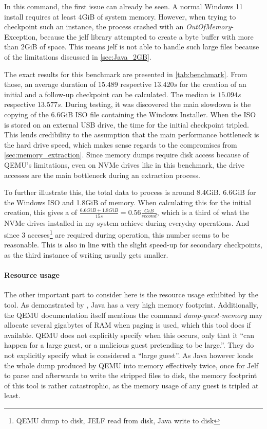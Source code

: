 In this command, the first issue can already be seen.
A normal Windows 11 install requires at least 4GiB of system memory.
However, when trying to checkpoint such an instance, the process crashed with an \emph{OutOfMemory}-Exception,
because the jelf library\cite{jelf} attempted to create a byte buffer with more than 2GiB of space.
This means jelf is not able to handle such large files because of the limitations discussed in \autoref{sec:Java_2GB}.

The exact results for this benchmark are presented in \autoref{tab:benchmark}.
From those, an average duration of $15.489$ respective $13.420s$ for the creation of an initial and a follow-up checkpoint can be calculated.
The median is $15.094s$ respective $13.577s$.
During testing, it was discovered the main slowdown is the copying of the 6.6GiB ISO file containing the Windows Installer.
When the ISO is stored on an external USB drive, the time for the initial checkpoint tripled.
This lends credibility to the assumption that the main performance bottleneck is the hard drive speed,
which makes sense regards to the compromises from \autoref{sec:memory_extraction}.
Since memory dumps require disk access because of QEMU's limitations,
even on NVMe drives like in this benchmark, the drive accesses are the main bottleneck during an extraction process.

To further illustrate this, the total data to process is around 8.4GiB. 6.6GiB for the Windows ISO and 1.8GiB of memory.
When calculating this for the initial creation, this gives a  of $\frac{6.6GiB + 1.8 GiB}{15s}=0.56\frac{GiB}{second}$,
which is a third of what the NVMe drives installed in my system achieve during everyday operations.
And since 3 acceses\footnote{QEMU dump to disk, JELF read from disk, Java write to disk} are required during operation,
this number seems to be reasonable.
This is also in line with the slight speed-up for secondary checkpoints, as the third instance of writing usually gets smaller.

\paragraph{Resource usage} The other important part to consider here is the resource usage exhibited by the tool.
As demonstrated by ,
Java has a very high memory footprint\cite{Java_Performance}.
Additionally, the QEMU documentation itself mentions the command \emph{dump-guest-memory}
may allocate several gigabytes of RAM when paging is used,
which this tool does if available.
QEMU does not explicitly specify when this occurs,
only that it \enquote{can happen for a large guest, or a malicious guest pretending to be large.}\cite{qmp-commands}.
They do not explicitly specify what is considered a \enquote{large guest}.
As Java however loads the whole dump produced by QEMU into memory effectively twice,
once for Jelf to parse and afterwards to write the stripped files to disk,
the memory footprint of this tool is rather catastrophic,
as the memory usage of any guest is tripled at least.

